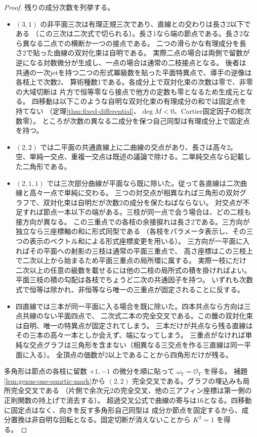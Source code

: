 \begin{proof}
残りの成分次数を列挙する。
\begin{itemize}
\item $(3,1)$ の非平面三次は有理正規三次であり、直線との交わりは長さ2以下である
（この三次は二次式で切られる）。長さ1なら端の節点である。長さ2なら異なる二点での横断か一つの接点である。
二つの滑らかな有理成分を長さ2で貼った曲線の双対化束は自明である。
実際二点の場合は両側で留数が逆になる対数微分が生成し、一点の場合は通常の二枝接点となる。
後者は共通の一次jetを持つ二つの形式冪級数を貼った平面特異点で、導手の逆像は各枝上で次数2、
算術種数1である。各成分上で双対化束の次数は零で、非零の大域切断は
片方で恒等零なら接点で他方の定数も零となるため生成元となる。
四移動は以下このような自明な双対化束の有理成分の和では固定点を持てない
（定理\ref{thm:fixed-differential}、$\deg M<0$、Cartier固定因子の総次数零）。
ところが次数の異なる二成分を保つ自己同型は有理成分上で固定点を持つ。
\item $(2,2)$ では二平面の共通直線上に二曲線の交点があり、長さは高々2。
空、単純一交点、重複一交点は既述の議論で除ける。二単純交点なら記載した二角形である。
\item $(2,1,1)$ では三次部分曲線が平面なら既に除いた。従って各直線は二次曲線と高々一点で単純に交わる。
三つの対交点が相異なれば三角形の双対グラフで、双対化束は自明だが次数2の成分を保たねばならない。
対交点が不足すれば節点一本以下の端がある。三枝が同一点で会う場合は、どの二枝も接方向が異なる。
この三重点での各枝の余接捩れは長さ2である。三方向が独立なら三座標軸の和に形式同型である
（各枝をパラメータ表示し、その三つの表示のベクトル和による形式座標変更を用いる）。
三方向が一平面に入ればその平面への射影の三枝は通常の平面三重点で、
高さ座標はこの三枝上で二次以上から始まるため平面三重点の局所環に属する。
実際一枝にだけ二次以上の任意の級数を載せるには他の二枝の局所式の積を掛ければよい。
平面三枝の積の勾配は各枝でちょうど二次の共通因子を持つ。
いずれも次数式で恒等は除かれ、非恒等なら唯一の三重点が固定されることに反する。
\item 四直線では三本が同一平面に入る場合を既に除いた。四本共点なら方向は三点共線のない平面四点で、
二次式二本の完全交叉である。この錐の双対化束は自明、唯一の特異点が固定されてしまう。
三本だけが共点なら残る直線はその三本の高々一本としか会えず、端になってしまう。
三重点がなければ単純な交点グラフは三角形を含まない（相異なる三交点を作る三直線は同一平面に入る）。
全頂点の価数が2以上であることから四角形だけが残る。
\end{itemize}
多角形は節点の各枝に留数 $+1,-1$ の微分を順に貼って $\omega_Y=\mathcal O_Y$ を得る。
補題\ref{lem:genus-one-quartic-mark}から $(2,2)$ 完全交叉である。グラフの埋込みも局所完全交叉である
（片側で余次元2の完全交叉、他の三アフィン座標は第一側の正則関数の持上げで消去する）。
超過交叉公式で曲線の寄与は16となる。四移動に固定点はなく、向きを反す多角形自己同型は
成分か節点を固定するから、成分置換は非自明な回転となる。固定切断が消えないことから $K^2=1$ を得る。
\end{proof}

